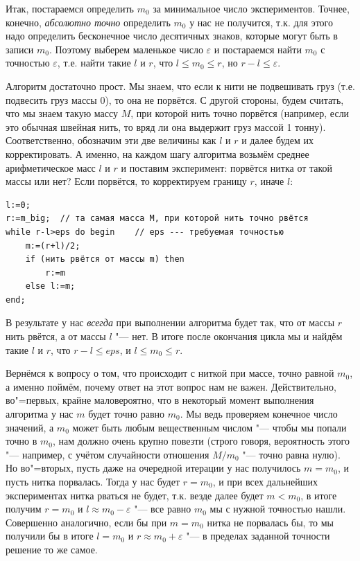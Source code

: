 \documentclass[a4paper,10pt]{problems}
\let\eps\varepsilon
\begin{document}
Итак, постараемся определить $m_0$ за минимальное число экспериментов. 
Точнее, конечно, \textit{абсолютно точно} определить $m_0$ у нас не получится, т.к. для этого надо определить бесконечное число десятичных знаков, 
которые могут быть в записи $m_0$. 
Поэтому выберем маленькое число $\eps$ и постараемся найти $m_0$ с точностью $\eps$, 
т.е. найти такие $l$ и $r$, что $l\leq m_0\leq r$, но $r-l\leq \eps$.

Алгоритм достаточно прост. Мы знаем, что если к нити не подвешивать груз (т.е. подвесить груз массы $0$), то она не порвётся. 
С другой стороны, будем считать, что мы знаем такую массу $M$, при которой нить точно порвётся 
(например, если это обычная швейная нить, то вряд ли она выдержит груз массой 1 тонну).
Соответственно, обозначим эти две величины как $l$ и $r$ и далее будем их корректировать. 
А именно, на каждом шагу алгоритма возьмём среднее арифметическое масс $l$ и $r$ и поставим эксперимент: порвётся нитка от такой массы или нет? 
Если порвётся, то корректируем границу $r$, иначе $l$:
\begin{codesampleo}\begin{verbatim}
l:=0;
r:=m_big;  // та самая масса M, при которой нить точно рвётся
while r-l>eps do begin    // eps --- требуемая точностью
    m:=(r+l)/2;
    if (нить рвётся от массы m) then
        r:=m
    else l:=m;
end;
\end{verbatim}
\end{codesampleo}

В результате у нас \textit{всегда} при выполнении алгоритма будет так, что от массы $r$ нить рвётся, а от массы $l$ "--- нет. 
В итоге после окончания цикла мы и найдём такие $l$ и $r$, что $r-l\leq eps$, и $l\leq m_0\leq r$.

Вернёмся к вопросу о том, что происходит с ниткой при массе, точно равной $m_0$, а именно поймём, почему ответ на этот вопрос нам не важен.
Действительно, во"=первых, крайне маловероятно, что в некоторый момент выполнения алгоритма у нас $m$ будет точно равно $m_0$.
Мы ведь проверяем конечное число значений, а $m_0$ может быть любым вещественным числом "--- чтобы мы попали точно в $m_0$,
нам должно очень крупно повезти (строго говоря, вероятность этого "--- например, с учётом случайности отношения $M/m_0$ "--- точно равна нулю).
Но во"=вторых, пусть даже на очередной итерации у нас получилось $m=m_0$, и пусть нитка порвалась. 
Тогда у нас будет $r=m_0$, и при всех дальнейших экспериментах нитка рваться не будет, т.к. везде далее будет $m<m_0$,
в итоге получим $r=m_0$ и $l\approx m_0-\eps$ "--- все равно $m_0$ мы с нужной точностью нашли. 
Совершенно аналогично, если бы при $m=m_0$ нитка не порвалась бы, то мы получили бы в итоге $l=m_0$ и $r\approx m_0+\eps$ 
"--- в пределах заданной точности решение то же самое.
\end{document}

